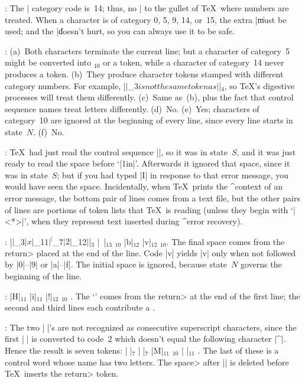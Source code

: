 {{{:
 The |%
category code is~14; thus, no |%
to the gullet of \TeX\ where numbers are treated. When a character is
of category 0, 5, 9, 14, or~15, the extra |\| must be used; and the
|\| doesn't hurt, so you can always use it to be safe.

:
 (a)~Both characters terminate the current line; but a character of
category~5 might be converted into \]$_{10}$ or a  token, while
a character of category~14 never produces a token.  (b)~They produce
character tokens stamped with different category numbers.  For example,
|$|$_3$ is not the same token as |$|$_4$, so \TeX's digestive processes
will treat them differently.  (c)~Same as~(b), plus the fact that control
sequence names treat letters differently.  (d)~No. (e)~Yes; characters of
category~10 are ignored at the beginning of every line, since every line
starts in state~$N$. (f)~No.

:
 \TeX\ had just read the control sequence |\vship|, so it
was in state~$S$, and it was just ready to read the space before `|1in|'.
Afterwards it ignored that space, since it was in state~$S$; but if
you had typed |I\obeyspaces| in response to that error message,
you would have seen the space. Incidentally, when \TeX\ prints
the ^{context of an error message}, the bottom pair of lines comes from
a text file, but the other pairs of lines are portions of token lists
that \TeX\ is reading (unless they begin with `|<*>|', when they
represent text inserted during ^{error recovery}).

:
 |$|$_{3}$ |x|$_{11}$ |^|$_7$ |2|$_{12}$ |$|$_{3}$ |~|$_{13}$ \]$_{10}$
 |b|$_{12}$ |v|$_{12}$ \]$_{10}$. The final space comes from the
\<return> placed at the end of the line. Code |^^6| yields |v| only
when not followed by |0|--|9| or |a|--|f|.
The initial space is ignored, because state~$N$
governs the beginning of the line.

:
 |H|$_{11}$ |i|$_{11}$ |!|$_{12}$ \]$_{10}$ 
. The `\]' comes from the \<return> at the
end of the first line; the second and third lines each contribute
a .

:
 The two |^^B|'s are not recognized as consecutive superscript
characters, since the first |^^B| is converted to code~2 which doesn't
equal the following character |^|. Hence
the result is seven tokens: |^^B|$_7$ |^^B|$_7$
|M|$_{11}$  \]$_{10}$ |^^M|$_{11}$ .
The last of these is a control word whose name has two letters.
The \<space> after |\M| is deleted before \TeX\ inserts the \<return> token.

}}}
